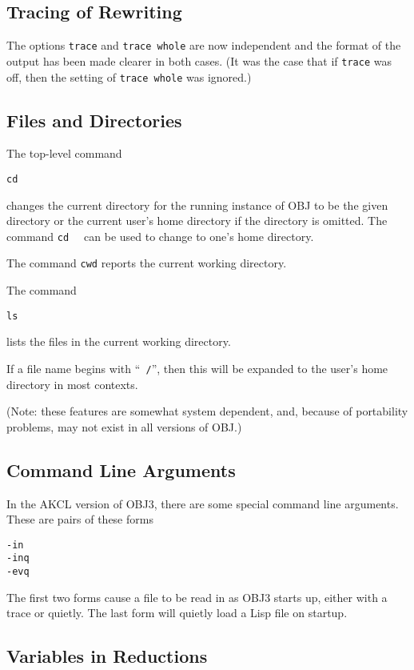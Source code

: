 \subsection{Tracing of Rewriting}

The options {\tt trace} and {\tt trace whole} are now independent and
the format of the output has been made clearer in both cases.  (It was
the case that if {\tt trace} was off, then the setting of {\tt trace
  whole} was ignored.)

\subsection{Files and Directories}

The top-level command
\begin{alltt}
        cd 
\end{alltt}
changes the current directory for the running instance of OBJ to be
the given directory or the current user's home directory if the
directory is omitted.  The command {\tt cd ~} can be used to change to
one's home directory.

The command {\tt cwd} reports the current working directory.

The command
\begin{alltt}
        ls
\end{alltt}
lists the files in the current working directory.

If a file name begins with ``{\tt ~/}'', then this will be expanded to
the user's home directory in most contexts.

(Note: these features are somewhat system dependent, and, because of
portability problems, may not exist in all versions of OBJ.)

\subsection{Command Line Arguments}

In the AKCL version of OBJ3, there are some special command line
arguments.  These are pairs of these forms
\begin{alltt}
    -in 
    -inq 
    -evq 
\end{alltt}
The first two forms cause a file to be read in as OBJ3 starts up,
either with a trace or quietly.  The last form will quietly load a
Lisp file on startup.

\subsection{Variables in Reductions}
\label{var-reductions}

